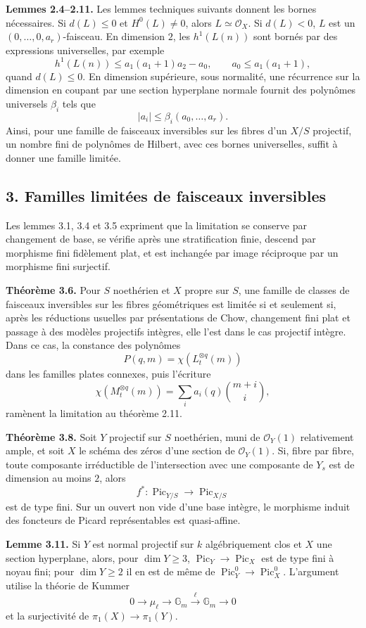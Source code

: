 \documentclass[11pt]{article}
\providecommand{\Pic}{\operatorname{Pic}}
\begin{document}
\textbf{Lemmes 2.4--2.11.} Les lemmes techniques suivants donnent les bornes n\'ecessaires. Si $d(L)\le0$ et $H^0(L)\ne0$, alors $L\simeq\mathcal O_X$. Si $d(L)<0$, $L$ est un $(0,\ldots,0,a_r)$-faisceau. En dimension $2$, les $h^1(L(n))$ sont born\'es par des expressions universelles, par exemple
\[
 h^1(L(n))\le a_1(a_1+1)a_2-a_0,
\qquad a_0\le a_1(a_1+1),
\]
quand $d(L)\le0$. En dimension sup\'erieure, sous normalit\'e, une r\'ecurrence sur la dimension en coupant par une section hyperplane normale fournit des polyn\^omes universels $\beta_i$ tels que
\[
 |a_i|\le\beta_i(a_0,\ldots,a_r).
\]
Ainsi, pour une famille de faisceaux inversibles sur les fibres d'un $X/S$ projectif, un nombre fini de polyn\^omes de Hilbert, avec ces bornes universelles, suffit \`a donner une famille limit\'ee.

\subsection*{3. Familles limit\'ees de faisceaux inversibles}
Les lemmes 3.1, 3.4 et 3.5 expriment que la limitation se conserve par changement de base, se v\'erifie apr\`es une stratification finie, descend par morphisme fini fid\`element plat, et est inchang\'ee par image r\'eciproque par un morphisme fini surjectif.

\textbf{Th\'eor\`eme 3.6.} Pour $S$ noeth\'erien et $X$ propre sur $S$, une famille de classes de faisceaux inversibles sur les fibres g\'eom\'etriques est limit\'ee si et seulement si, apr\`es les r\'eductions usuelles par pr\'esentations de Chow, changement fini plat et passage \`a des mod\`eles projectifs int\`egres, elle l'est dans le cas projectif int\`egre. Dans ce cas, la constance des polyn\^omes
\[
 P(q,m)=\chi(L_t^{\otimes q}(m))
\]
dans les familles plates connexes, puis l'\'ecriture
\[
 \chi(M_t^{\otimes q}(m))=\sum_i a_i(q)\binom{m+i}{i},
\]
ram\`enent la limitation au th\'eor\`eme 2.11.

\textbf{Th\'eor\`eme 3.8.} Soit $Y$ projectif sur $S$ noeth\'erien, muni de $\mathcal O_Y(1)$ relativement ample, et soit $X$ le sch\'ema des z\'eros d'une section de $\mathcal O_Y(1)$. Si, fibre par fibre, toute composante irr\'eductible de l'intersection avec une composante de $Y_s$ est de dimension au moins $2$, alors
\[
 f^*: \Pic_{Y/S}\longrightarrow\Pic_{X/S}
\]
est de type fini. Sur un ouvert non vide d'une base int\`egre, le morphisme induit des foncteurs de Picard repr\'esentables est quasi-affine.

\textbf{Lemme 3.11.} Si $Y$ est normal projectif sur $k$ alg\'ebriquement clos et $X$ une section hyperplane, alors, pour $\dim Y\ge3$, $\Pic_Y\to\Pic_X$ est de type fini \`a noyau fini; pour $\dim Y\ge2$ il en est de m\^eme de $\Pic_Y^0\to\Pic_X^0$. L'argument utilise la th\'eorie de Kummer
\[
0\to\mu_\ell\to\mathbb G_m\xrightarrow{\ell}\mathbb G_m\to0
\]
et la surjectivit\'e de $\pi_1(X)\to\pi_1(Y)$.
\end{document}
